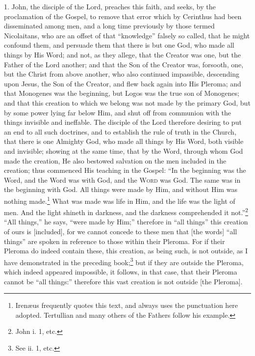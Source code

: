 1. John, the disciple of the Lord, preaches this faith, and seeks, by the proclamation of the Gospel, to remove that error which by Cerinthus had been disseminated among men, and a long time previously by those termed Nicolaitans, who are an offset of that “knowledge” falsely so called, that he might confound them, and persuade them that there is but one God, who made all things by His Word; and not, as they allege, that the Creator was one, but the Father of the Lord another; and that the Son of the Creator was, forsooth, one, but the Christ from above another, who also continued impassible, descending upon Jesus, the Son of the Creator, and flew back again into His Pleroma; and that Monogenes was the beginning, but Logos was the true son of Monogenes; and that this creation to which we belong was not made by the primary God, but by some power lying far below Him, and shut off from communion with the things invisible and ineffable. The disciple of the Lord therefore desiring to put an end to all such doctrines, and to establish the rule of truth in the Church, that there is one Almighty God, who made all things by His Word, both visible and invisible; showing at the same time, that by the Word, through whom God made the creation, He also bestowed salvation on the men included in the creation; thus commenced His teaching in the Gospel: “In the beginning was the Word, and the Word was with God, and the \textsc{Word} was God. The same was in the beginning with God. All things were made by Him, and without Him was nothing made.\footnote{Irenæus frequently quotes this text, and always uses the punctuation here adopted. Tertullian and many others of the Fathers follow his example.} What was made was life in Him, and the life was the light of men. And the light shineth in darkness, and the darkness comprehended it not.”\footnote{John i. 1, etc.} “All things,” he says, “were made by Him;” therefore in “all things” this creation of ours is [included], for we cannot concede to these men that [the words] “all things” are spoken in reference to those within their Pleroma. For if their Pleroma do indeed contain these, this creation, as being such, is not outside, as I have demonstrated in the preceding book;\footnote{See ii. 1, etc.} but if they are outside the Pleroma, which indeed appeared impossible, it follows, in that case, that their Pleroma cannot be “all things:” therefore this vast creation is not outside [the Pleroma].

